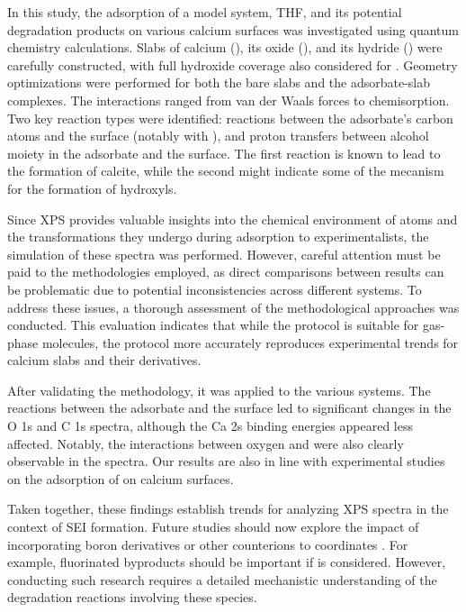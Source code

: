 \documentclass[journal=jpccck,manuscript=article]{achemso}
\begin{document}
In this study, the adsorption of a model system, THF, and its potential degradation products on various calcium surfaces was investigated using quantum chemistry calculations. Slabs of calcium (), its oxide (), and its hydride () were carefully constructed, with full hydroxide coverage also considered for . Geometry optimizations were performed for both the bare slabs and the adsorbate-slab complexes. The interactions ranged from van der Waals forces to chemisorption. Two key reaction types were identified: reactions between the adsorbate’s carbon atoms and the surface (notably with ), and proton transfers between alcohol moiety in the adsorbate and the  surface. The first reaction is known to lead to the formation of calcite\cite{dahleSituPreparationCalcium2012}, while the second might indicate some of the mecanism for the formation of hydroxyls.

Since XPS provides valuable insights into the chemical environment of atoms and the transformations they undergo during adsorption to experimentalists, the simulation of these spectra was performed. However, careful attention must be paid to the methodologies employed, as direct comparisons between results can be problematic due to potential inconsistencies across different systems. To address these issues, a thorough assessment of the methodological approaches was conducted. This evaluation indicates that while the  protocol is suitable for gas-phase molecules, the  protocol more accurately reproduces experimental trends for calcium slabs and their derivatives.

After validating the methodology, it was applied to the various systems. The reactions between the adsorbate and the surface led to significant changes in the O 1s and C 1s spectra, although the Ca 2s binding energies appeared less affected. Notably, the interactions between oxygen and  were also clearly observable in the spectra. Our results are also in line with experimental studies on the adsorption of  on calcium surfaces.\cite{voigtsAdsorptionCO2CO2009}

Taken together, these findings establish trends for analyzing XPS spectra in the context of SEI formation. Future studies should now explore the impact of incorporating boron derivatives or other counterions to coordinates . For example, fluorinated byproducts should be important if   is considered. However, conducting such research requires a detailed mechanistic understanding of the degradation reactions involving these species.\cite{youngPreventingElectrolyteDecomposition2021,yamijalaStabilityCalciumIon2021,pathreekerWhyTetrahydrofuranGood2021,baonguyenInvestigatingAbnormalConductivity2022,nguyenSolvationReductionCoupling2023}
\end{document}
